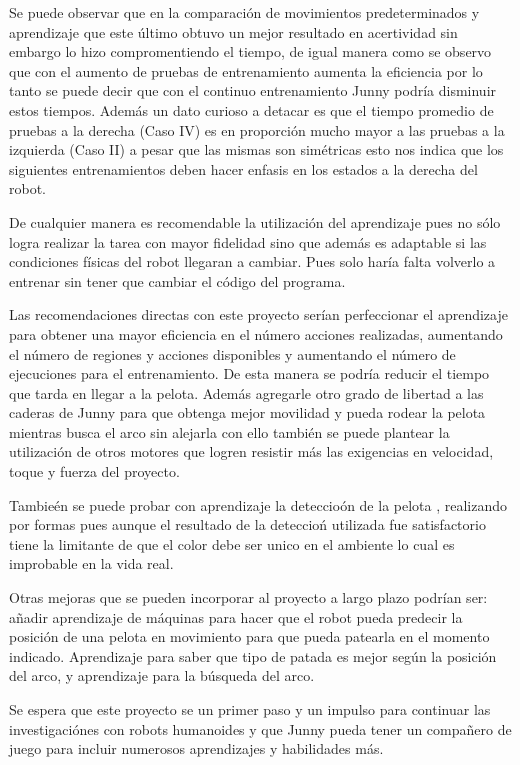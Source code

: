 Se puede observar que en la comparaci\'on de movimientos predeterminados y aprendizaje que este \'ultimo obtuvo un mejor resultado en acertividad sin embargo  lo hizo compromentiendo el tiempo, de igual manera como se observo que con el aumento de pruebas de entrenamiento aumenta la eficiencia por lo tanto se puede decir que con el continuo entrenamiento Junny podr\'ia disminuir estos tiempos. Adem\'as un dato curioso a detacar es que el tiempo promedio de pruebas a la derecha (Caso IV) es en proporci\'on mucho mayor a las pruebas a la izquierda (Caso II) a pesar que las mismas son sim\'etricas esto nos indica que los siguientes entrenamientos deben hacer enfasis en los estados a la derecha del robot. 

De cualquier manera es recomendable la utilizaci\'on del aprendizaje pues no s\'olo logra realizar la tarea con mayor fidelidad sino que adem\'as es adaptable si las condiciones f\'isicas del robot llegaran a cambiar. Pues solo haría falta volverlo a entrenar sin tener que cambiar el código del programa.
 
Las recomendaciones directas con este proyecto ser\'ian perfeccionar el aprendizaje para obtener una mayor eficiencia en el n\'umero acciones realizadas, aumentando el número de regiones y acciones disponibles y aumentando el número de ejecuciones para el entrenamiento. De esta manera se podría reducir el tiempo que tarda en llegar a la pelota. Además agregarle otro grado de libertad a las 
caderas de Junny para que obtenga mejor movilidad y pueda rodear la pelota mientras busca el arco sin alejarla con ello tambi\'en se puede plantear la utilizaci\'on de otros motores que logren resistir m\'as las exigencias en velocidad, toque y fuerza del proyecto.

Tambie\'en se puede probar con aprendizaje la deteccio\'on de la pelota , realizando por formas pues aunque el resultado de la deteccio\'n utilizada fue satisfactorio tiene la limitante de que el color debe ser unico en el ambiente lo cual es improbable en la vida real.  

Otras mejoras que se pueden incorporar al proyecto a largo plazo podrían ser: añadir aprendizaje de m\'aquinas para hacer que el robot pueda predecir la posición de una pelota en movimiento para que pueda patearla en el momento indicado. Aprendizaje para saber que tipo de patada es mejor seg\'un la posición del arco, y aprendizaje para la búsqueda del arco.

Se espera que este proyecto se un primer paso y un impulso para continuar las investigaci\'ones con robots humanoides y que Junny pueda tener un compa\~nero de juego para incluir numerosos aprendizajes y habilidades m\'as.


